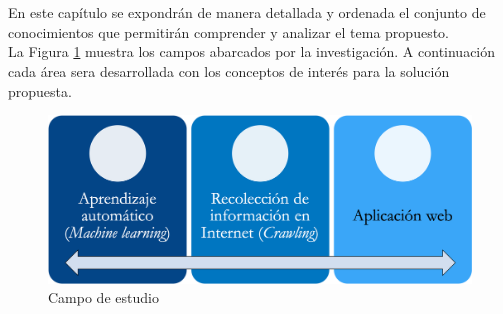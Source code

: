 
\ \\\\
En este capítulo se expondrán de manera detallada y ordenada el conjunto de conocimientos que permitirán comprender y analizar el tema propuesto. \\

La Figura \ref{fig:MarcoT} muestra los campos abarcados por la investigación.
A continuación cada área sera desarrollada con los conceptos de interés para la solución propuesta.

\begin{figure}[H]
	\centering
	\includegraphics[scale=.35]{imagenes/Capitulo3/Marco.png}
	\caption{Campo de estudio}
	\label{fig:MarcoT}
\end{figure}









